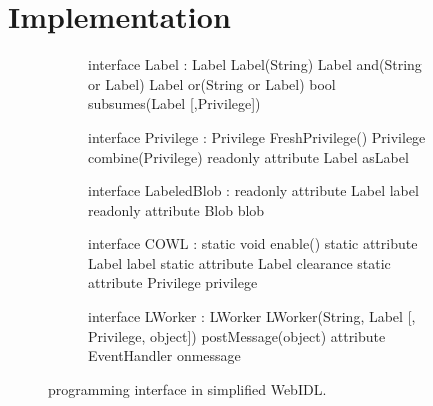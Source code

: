 \section{Implementation}
\label{sec:implementation}

\begin{figure}[t]
  \begin{subfigure}{\columnwidth}
    {\small
    \begin{webidl}
interface Label :
  Label Label(String)
  Label and(String or Label)
  Label or(String or Label)
  bool subsumes(Label [,Privilege])
    \end{webidl}
    \vspace*{-8pt}
    \begin{webidl}
interface Privilege :
  Privilege FreshPrivilege()
  Privilege combine(Privilege)
  readonly attribute Label asLabel
    \end{webidl}
    }
    \vspace*{-8pt}
    \label{fig:api:policy} 
    \vspace*{8pt}
  \end{subfigure}
  \begin{subfigure}{\columnwidth}
    {\small
    \begin{webidl}
interface LabeledBlob :
  readonly attribute Label label
  readonly attribute Blob blob
    \end{webidl}
    }
    \vspace*{-8pt}
    \label{fig:api:blob} 
    \vspace*{8pt}
  \end{subfigure}
  \begin{subfigure}{\columnwidth}
    {\small
    \begin{webidl}
interface COWL :
  static void enable()
  static attribute Label label
  static attribute Label clearance 
  static attribute Privilege privilege
    \end{webidl}
    \vspace*{-8pt}
    \begin{webidl}
interface LWorker :
  LWorker LWorker(String, Label
                  [, Privilege, object])
  postMessage(object)
  attribute EventHandler onmessage
    \end{webidl}
    }
    \vspace*{-8pt}
    \label{fig:api:compartments}
  \end{subfigure}
  \caption{\sys{} programming interface in simplified WebIDL.}
  \label{fig:api}
\end{figure}

